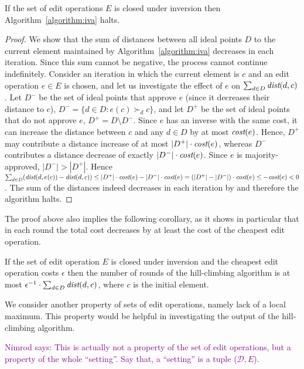\documentclass{llncs}
\newcommand{\nimrod}[1]{\textcolor{purple}{Nimrod says: #1}}
\newcommand{\calD}{\mathcal{D}}
\newcommand{\prefers}[1]{\succ_{#1}}
\newcommand{\dist}{\emph{dist}}
\newcommand{\cost}{\emph{cost}}
\begin{document}
\begin{lemma}\label{lemma:stops}
If the set of edit operations $E$ is closed under inversion then Algorithm~\ref{algorithm:iva} halts.
\end{lemma}

\begin{proof}
%
We show that the sum of distances between all ideal points $D$ to the current element maintained by Algorithm~\ref{algorithm:iva} decreases in each iteration. Since this sum cannot be negative, the process cannot continue indefinitely. Consider an iteration in which the current element is $c$ and an edit operation $e \in E$ is chosen, and let us investigate the effect of $e$ on $\sum_{d \in D} \dist(d, c)$.
%
Let $D^-$ be the set of ideal points that approve $e$ (since it decreases their distance to $c$), $D^- = \{d \in D: e(c) \prefers{d} c\}$,  and let $D^+$ be the set of ideal points that do not approve $e$, $D^+ = D \setminus D^-$. Since $e$ has an inverse with the same cost, it can increase the distance between $c$ and any $d \in D$ by at most $\cost(e)$.
Hence,  $D^+$ may contribute a distance increase of at most $|D^+| \cdot \cost(e)$, whereas  $D^-$  contributes a distance decrease of exactly $|D^-| \cdot \cost(e)$. 
Since $e$ is majority-approved, $|D^-| > |D^+|$.   Hence  $\sum_{d \in D} (\dist(d, e(c)) -\dist(d,c)) \le |D^+| \cdot \cost(e) -  |D^-| \cdot \cost(e)  = (|D^+| - |D^-|) \cdot \cost(e) \le  -\cost(e) < 0$.  The sum of the distances indeed decreases in each iteration by and therefore the algorithm halts.
%
\end{proof}

The proof above also implies the following corollary, as it shows in particular that in each round the total cost decreases by at least the cost of the cheapest edit operation.

\begin{corollary}
  If the set of edit operation $E$ is closed under inversion and the cheapest edit operation costs $\epsilon$ then the number of rounds of the hill-climbing algorithm is at most $\epsilon^{-1} \cdot \sum_{d \in D} \dist(d, c)$, where $c$ is the initial element. 
\end{corollary}

We consider another property of sets of edit operations, namely lack of a local maximum. This property would be helpful in investigating the output of the hill-climbing algorithm.

\nimrod{This is actually not a property of the set of edit operations, but a property of the whole ``setting''. Say that, a ``setting'' is a tuple ($\calD, E$).}
\end{document}
